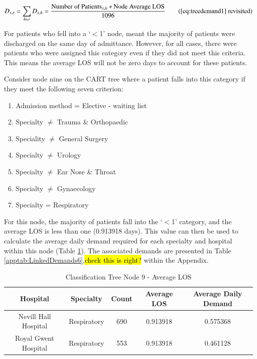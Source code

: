 \documentclass[../thesis.tex]{subfiles}
\begin{document}
\begin{equation}
        D_{s,r} = \sum\limits_{h \in r} D_{s,h} = \frac{\text{Number of Patients}_{s,h}*\text{Node Average LOS}}{1096} \tag{\ref{eq:treedemand1} revisited}\\
\end{equation}

For patients who fell into a `$<$1' node, meant the majority of patients were discharged on the same day of admittance. However, for all cases, there were patients who were assigned this category even if they did not meet this criteria. This means the average LOS will not be zero days to account for these patients.

Consider node nine on the CART tree where a patient falls into this category if they meet the following seven criterion:
\begin{enumerate}
    \item Admission method = Elective - waiting list
    \item Specialty $\neq$ Trauma \& Orthopaedic
    \item Speciality $\neq$ General Surgery
    \item Specialty $\neq$ Urology
    \item Specialty $\neq$ Ear Nose \& Throat
    \item Specialty $\neq$ Gynaecology
    \item Specialty = Respiratory
\end{enumerate}

For this node, the majority of patients fall into the `$<$1' category, and the average LOS is less than one (0.913918 days). This value can then be used to calculate the average daily demand required for each specialty and hospital within this node (Table \ref{tab:classnodeexample}). The associated demands are presented in Table \ref{apptab:LinkedDemands6},\hl{check this is right?} within the Appendix.

\begin{table}[h!]
    \centering
    \begin{tabular}{ccccc}\toprule
        \textbf{Hospital} & \textbf{Specialty} & \textbf{Count} & \textbf{Average LOS} & \textbf{Average Daily Demand}  \\\midrule
         Nevill Hall Hospital & Respiratory &   690 & 0.913918 & 0.575368 \\
Royal Gwent Hospital & Respiratory &   553 &0.913918 & 0.461128 \\ \bottomrule
    \end{tabular}
    \caption{Classification Tree Node 9 - Average LOS}
    \label{tab:classnodeexample}
\end{table}
\end{document}
